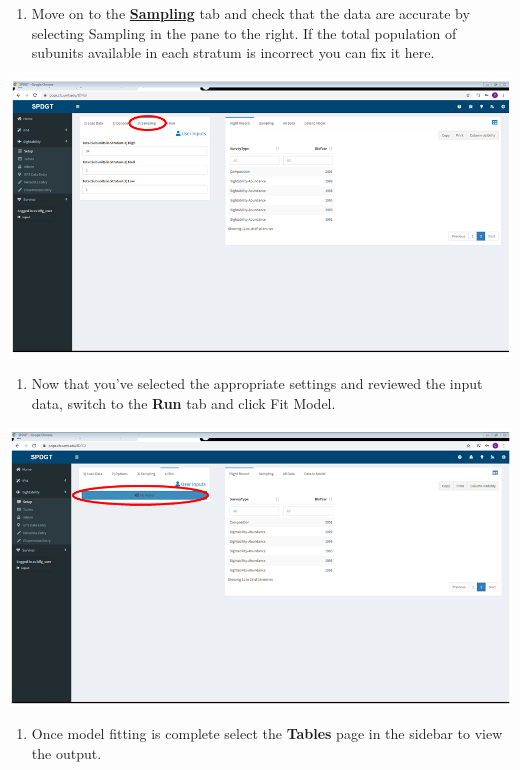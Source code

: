 \documentclass[
]{book}
\providecommand{\tightlist}{%
  \setlength{\itemsep}{0pt}\setlength{\parskip}{0pt}}
\begin{document}
\begin{enumerate}
\def\labelenumi{\arabic{enumi}.}
\setcounter{enumi}{6}
\tightlist
\item
  Move on to the \protect\hyperlink{sight-options}{\textbf{Sampling}} tab and check that the data are accurate by selecting Sampling in the pane to the right. If the total population of subunits available in each stratum is incorrect you can fix it here.
\end{enumerate}

\includegraphics{./www/sight_05.PNG}

\begin{enumerate}
\def\labelenumi{\arabic{enumi}.}
\setcounter{enumi}{7}
\tightlist
\item
  Now that you've selected the appropriate settings and reviewed the input data, switch to the \textbf{Run} tab and click {Fit Model}.
\end{enumerate}

\includegraphics{./www/sight_06.PNG}

\begin{enumerate}
\def\labelenumi{\arabic{enumi}.}
\setcounter{enumi}{8}
\tightlist
\item
  Once model fitting is complete select the \textbf{Tables} page in the sidebar to view the output.
\end{enumerate}
\end{document}
